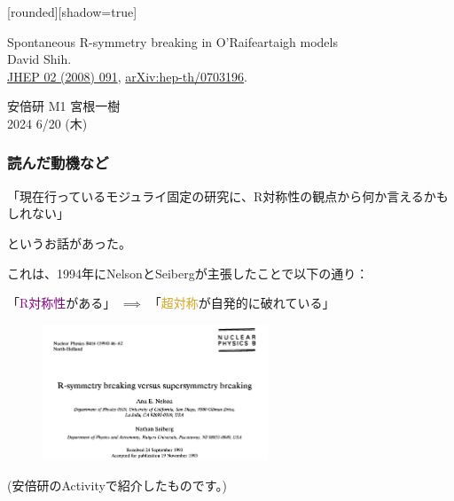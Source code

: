 \documentclass[
  unicode,a4paper,9pt,
  xcolor = {dvipsnames,svgnames},
  hyperref ={colorlinks=true,citecolor=Navy,linkcolor=NavyBlue,urlcolor=purple},
  ja=standard,lualatex
]{beamer}
\begin{document}
\begin{frame}

  [rounded][shadow=true]
  \begin{block}{}
    \vspace*{5pt}

    \centering\Large
    Spontaneous R-symmetry breaking in O'Raifeartaigh models
    \\
    \normalsize
    David Shih.
    \\
    \small
    \href{https://doi.org/10.1088/1126-6708/2008/02/091}{JHEP 02 (2008) 091},
    \href{https://arxiv.org/abs/hep-th/0703196}{arXiv:hep-th/0703196}.

    \vspace*{5pt}
  \end{block}

  \vspace*{1cm}

  \begin{center}
    安倍研 M1 宮根一樹\\
    2024 6/20 (木)
  \end{center}

\end{frame}

\nocite{Shih:2007av}

\begin{frame}
  \frametitle{読んだ動機など}

  \begin{center}
    「現在行っているモジュライ固定の研究に、R対称性の観点から何か言えるかもしれない」
  \end{center}
  というお話があった。

  これは、1994年にNelsonとSeibergが主張したこと\cite{Nelson:1993nf}で以下の通り：
  \begin{center}
    「\textcolor{DarkMagenta}{R対称性}がある」
    $\implies$
    「\textcolor{Goldenrod}{超対称}が自発的に破れている」
  \end{center}

  \begin{figure}
    \centering
    \includegraphics[width=0.6\textwidth]{fig/Nelson1993nf.PNG}
  \end{figure}

  \begin{center}
    (安倍研のActivityで紹介したものです。)
  \end{center}

\end{frame}
\end{document}
